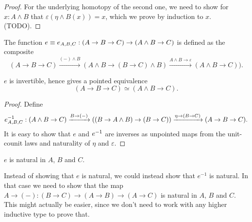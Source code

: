 \documentclass{article}
\newcommand{\pmap}{\to}
\newcommand{\lpmap}{\xrightarrow}
\renewcommand{\smash}{\wedge}
\renewcommand{\epsilon}{\varepsilon}
\begin{document}
\begin{proof}
  For the underlying homotopy of the second one, we need to show for $x:A\smash B$ that
  $\epsilon(\eta\smash B(x))=x$, which we prove by induction to $x$. (TODO).

\end{proof}

\begin{defn}
The function $e\jdeq e_{A,B,C}:(A\pmap B\pmap C)\pmap(A\smash B\pmap C)$ is defined as the composite
$$(A\pmap B\pmap C)\lpmap{({-})\smash B}(A\smash B\pmap (B\pmap C)\smash B)\lpmap{A\smash B \pmap\epsilon}(A\smash B\pmap C)).$$
\end{defn}

\begin{lem}
  $e$ is invertible, hence gives a pointed equivalence $$(A\pmap B\pmap C)\simeq(A\smash B\pmap C).$$
\end{lem}
\begin{proof}
  Define
  $$\inv{e}_{A,B,C}:(A\smash B\pmap C)\lpmap{B\pmap({-})}((B\pmap A\smash B)\pmap (B\pmap
  C))\lpmap{\eta\pmap(B\pmap C)}(A\pmap B\pmap C).$$ It is easy to show that $e$ and ${e}^{-1}$ are
  inverses as unpointed maps from the unit-counit laws and naturality of $\eta$ and $\epsilon$.
\end{proof}
\begin{lem}\label{e-natural}
$e$ is natural in $A$, $B$ and $C$.
\end{lem}
\begin{rmk}
\item Instead of showing that $e$ is natural, we could instead show that $e^{-1}$ is natural. In
  that case we need to show that the map $A\to({-}):(B\to C)\to(A\to B)\to(A\to C)$ is natural in
  $A$, $B$ and $C$. This might actually be easier, since we don't need to work with any higher
  inductive type to prove that.
\end{rmk}
\end{document}
